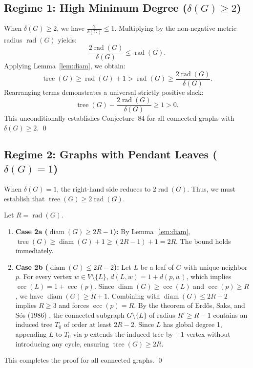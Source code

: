 \documentclass[11pt,a4paper]{article}
\theoremstyle{plain}
\theoremstyle{definition}
\begin{document}
\subsection{Regime 1: High Minimum Degree ($\delta(G) \ge 2$)}
When $\delta(G) \ge 2$, we have $\frac{2}{\delta(G)} \le 1$. Multiplying by the non-negative metric radius $\operatorname{rad}(G)$ yields:
\[
\frac{2 \operatorname{rad}(G)}{\delta(G)} \le \operatorname{rad}(G).
\]
Applying Lemma~\ref{lem:diam}, we obtain:
\[
\operatorname{tree}(G) \ge \operatorname{rad}(G) + 1 > \operatorname{rad}(G) \ge \frac{2 \operatorname{rad}(G)}{\delta(G)}.
\]
Rearranging terms demonstrates a universal strictly positive slack:
\[
\operatorname{tree}(G) - \frac{2 \operatorname{rad}(G)}{\delta(G)} \ge 1 > 0.
\]
This unconditionally establishes Conjecture~84 for all connected graphs with $\delta(G) \ge 2$. \qed

\subsection{Regime 2: Graphs with Pendant Leaves ($\delta(G) = 1$)}
When $\delta(G) = 1$, the right-hand side reduces to $2 \operatorname{rad}(G)$. Thus, we must establish that $\operatorname{tree}(G) \ge 2 \operatorname{rad}(G)$.

Let $R = \operatorname{rad}(G)$.
\begin{enumerate}
    \item \textbf{Case 2a ($\operatorname{diam}(G) \ge 2R - 1$):} By Lemma~\ref{lem:diam}, $\operatorname{tree}(G) \ge \operatorname{diam}(G) + 1 \ge (2R - 1) + 1 = 2R$. The bound holds immediately.
    \item \textbf{Case 2b ($\operatorname{diam}(G) \le 2R - 2$):} Let $L$ be a leaf of $G$ with unique neighbor $p$. For every vertex $w \in V \setminus \{L\}$, $d(L, w) = 1 + d(p, w)$, which implies $\operatorname{ecc}(L) = 1 + \operatorname{ecc}(p)$. Since $\operatorname{diam}(G) \ge \operatorname{ecc}(L)$ and $\operatorname{ecc}(p) \ge R$, we have $\operatorname{diam}(G) \ge R + 1$. Combining with $\operatorname{diam}(G) \le 2R - 2$ implies $R \ge 3$ and forces $\operatorname{ecc}(p) = R$. By the theorem of Erd\H{o}s, Saks, and S\'os (1986) \cite{erdos1986maximum}, the connected subgraph $G \setminus \{L\}$ of radius $R' \ge R - 1$ contains an induced tree $T_0$ of order at least $2R - 2$. Since $L$ has global degree 1, appending $L$ to $T_0$ via $p$ extends the induced tree by $+1$ vertex without introducing any cycle, ensuring $\operatorname{tree}(G) \ge 2R$.
\end{enumerate}
This completes the proof for all connected graphs. \qed
\end{document}
